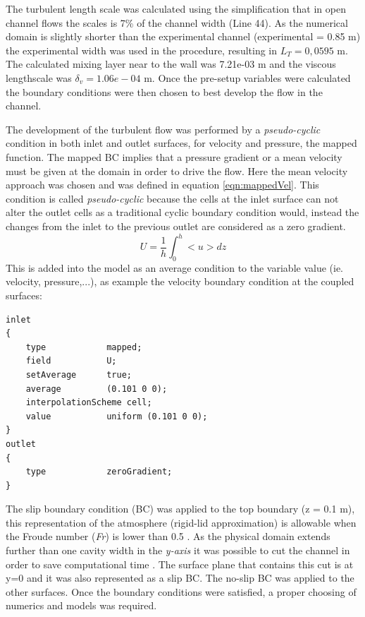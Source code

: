 \begin{refsection}
The turbulent length scale was calculated using the simplification that in open channel flows the scales is 7\% of the channel width (Line 44). As the numerical domain is slightly shorter than the experimental channel (experimental = 0.85 m) the experimental width was used in the procedure, resulting in $L_T = 0,0595$ m. The calculated mixing layer near to the wall was 7.21e-03 m and the viscous lengthscale was $\delta_v=1.06e-04$ m. Once the pre-setup variables were calculated the boundary conditions were then chosen to best develop the flow in the channel.

The development of the turbulent flow was performed by a \textit{pseudo-cyclic} condition in both inlet and outlet surfaces, for velocity and pressure, the mapped function. The mapped BC implies that a pressure gradient or a mean velocity must be given at the domain in order to drive the flow. Here the mean velocity approach was chosen and was defined in equation \ref{eqn:mappedVel}. This condition is called \textit{pseudo-cyclic} because the cells at the inlet surface can not alter the outlet cells as a traditional cyclic boundary condition would, instead the changes from the inlet to the previous outlet are considered as a zero gradient. 
\begin{equation}
U=\frac{1}{h}\int_{0}^{h}<u>dz
\label{eqn:mappedVel}
\end{equation}
This is added into the model as an average condition to the variable value (ie.  velocity, pressure,...), as example the velocity boundary condition at the coupled surfaces:

\begin{lstlisting}
inlet
{
	type            mapped;
	field           U;
	setAverage      true;
	average         (0.101 0 0);
	interpolationScheme cell;
	value           uniform (0.101 0 0);
}
outlet
{
	type			zeroGradient;
}
\end{lstlisting}

The slip boundary condition (BC) was applied to the top boundary (z = 0.1 m), this representation of the atmosphere (rigid-lid approximation) is allowable when the Froude number (\textit{Fr}) is lower than 0.5 \cite{alfrink1983}. As the physical domain extends further than one cavity width in the \textit{y-axis} it was possible to cut the channel in order to save computational time \cite{Brevis2014}. The surface plane that contains this cut is at y=0 and it was also represented as a slip BC. The no-slip BC was applied to the other surfaces. Once the boundary conditions were satisfied, a proper choosing of numerics and models was required.


\end{refsection}
